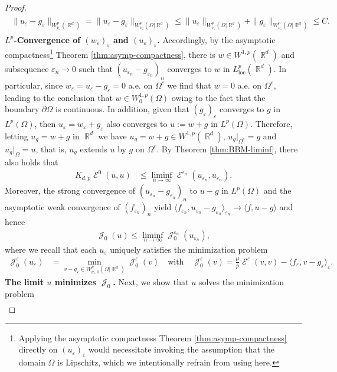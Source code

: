 \documentclass[12pt, reqno]{amsart}%
\theoremstyle{plain}  %
\theoremstyle{definition}  %
\numberwithin{equation}{section}
\DeclareMathOperator{\loc}{loc}
\DeclareMathOperator{\cE}{\mathcal{E}}
\DeclareMathOperator{\cJ}{\mathcal{J}}
\DeclareMathOperator{\R}{\mathbb{R}}
\newcommand{\eps}{\varepsilon}
\newcommand{\WnuOmRa}{W^p_{\nu_\eps}(\Omega|\R^d )}
\newcommand{\WnuOmRao}{W^p_{\nu_\eps,0}(\Omega|\R^d)}
\begin{document}
\begin{proof}
\begin{align*}
\begin{split}
\|u_\eps-g_\eps\|_{W^p_{\nu_{\eps} }(\R^d)}= \|u_\eps-g_\eps\|_{\WnuOmRa}\leq \|u_\eps\|_{\WnuOmRa}+ \|g_\eps\|_{\WnuOmRa}
\leq C.
\end{split}
\end{align*}
\textbf{$L^p$-Convergence of $(w_\eps)_\eps$ and $(u_\eps)_\eps$.} Accordingly, by the asymptotic compactness\footnote{Applying the asymptotic compactness Theorem \ref{thm:asymp-compactness} directly on $(u_\eps)_\eps$ would necessitate invoking the assumption that the domain  $\Omega$ is  Lipschitz, which we intentionally refrain from using here.}
Theorem \ref{thm:asymp-compactness}, there is $w\in W^{1,p}(\R^d)$ and subsequence $\eps_n\to 0$ such that $(u_{\eps_n} -g_{\eps_n} )_n$ converges to $w$ in $L^p_{\loc}(\R^d)$.  In particular, since $w_\eps= u_\eps-g_\eps=0$ a.e. on $\Omega^c$ we find that $w=0$ a.e. on $\Omega^c$, leading to the conclusion that $w\in W^{1,p}_0(\Omega)$ owing to  the fact that the boundary $\partial\Omega$ is continuous.  In addition,  given that $(g_{\eps})_\eps$ converges to $g$ in $L^p(\Omega)$,  then  $ u_\eps= w_\eps+ g_\eps$  also converges to $u:= w+g$ in $L^p(\Omega)$. Therefore, letting $u_g=w+ g$  in $\R^d$ we have  $u_g= w+g\in W^{1,p}(\R^d)$, $u_g|_{\Omega^c}= g$ and   $u_g|_\Omega= u$, that is, $u_g$ extends $u$ by $g$ on $\Omega^c$. By Theorem \ref{thm:BBM-liminf}, there also holds that
\begin{align*}
K_{d,p}\cE^0(u,u)&\leq \liminf_{n\to\infty}\cE^{\eps_n}(u_{\eps_n}, u_{\eps_n}).
\end{align*}
Moreover, the strong convergence of $(u_{\eps_n}-g_{\eps_n})_n$ to $u-g$ in $L^p(\Omega)$ and the asymptotic weak convergence of $(f_{\eps_n} )_n $ yield $\langle f_{\eps_n}, u_{\eps_n}-g_{\eps_n} \rangle_{\eps_n }\to \langle f ,u-g\rangle$ and  hence
\begin{align*}
\cJ_0(u)\leq \liminf_{n\to \infty}\cJ_0^{\eps_n}(u_{\eps_n}),
\end{align*}
where we recall that each $u_\eps$  uniquely  satisfies the minimization problem
\begin{align*}
\cJ_0^\eps(u_\eps) &= \min_{v-g_\eps\in \WnuOmRao} \cJ_0^\eps(v)
\quad \text{with}\quad
\cJ_0^\eps(v) = \tfrac{\mu}{p} \cE^\eps(v,v)
-\langle f_\eps , v-g_\eps\rangle_\eps.
\end{align*}
\textbf{The limit $u$ minimizes $\cJ_0$.} Next, we show that  $u$  solves the minimization problem
\begin{align*}

\end{align*}
\end{proof}
\end{document}
